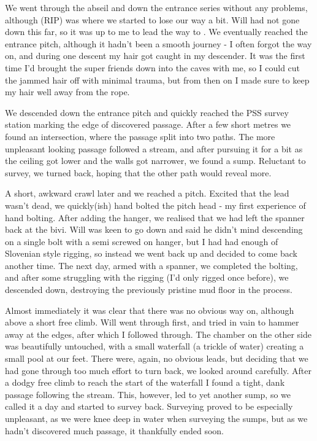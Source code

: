 We went through the abseil and down the entrance series without any problems, although  (RIP) was where we started to lose our way a bit. Will had not gone down this far, so it was up to me to lead the way to . We eventually reached the  entrance pitch, although it hadn't been a smooth journey - I often forgot the way on, and during one descent my hair got caught in my descender. It was the first time I'd brought the super friends down into the caves with me, so I could cut the jammed hair off with minimal trauma, but from then on I made sure to keep my hair well away from the rope.

We descended down the  entrance pitch and quickly reached the PSS survey station marking the edge of discovered passage. After a few short metres we found an intersection, where the passage split into two paths. The more unpleasant looking passage followed a stream, and after pursuing it for a bit as the ceiling got lower and the walls got narrower, we found a sump. Reluctant to survey, we turned back, hoping that the other path would reveal more. 

A short, awkward crawl later and we reached a pitch. Excited that the lead wasn't dead, we quickly(ish) hand bolted the pitch head - my first experience of hand bolting. After adding the hanger, we realised that we had left the spanner back at the bivi. Will was keen to go down and said he didn't mind descending on a single bolt with a semi screwed on hanger, but I had had enough of Slovenian style rigging, so instead we went back up and decided to come back another time.
The next day, armed with a spanner, we completed the bolting, and after some struggling with the rigging (I'd only rigged once before), we descended down, destroying the previously pristine mud floor in the process. 

Almost immediately it was clear that there was no obvious way on, although  above a short free climb. Will went through first, and tried in vain to hammer away at the edges, after which I followed through. The chamber on the other side was beautifully untouched, with a small waterfall (a trickle of water) creating a small pool at our feet. There were, again, no obvious leads, but deciding that we had gone through too much effort to turn back, we looked around carefully. After a dodgy free climb to reach the start of the waterfall I found a tight, dank passage following the stream. This, however, led to yet another sump, so we called it a day and started to survey back. 
Surveying proved to be especially unpleasant, as we were knee deep in water when surveying the sumps, but as we hadn't discovered much passage, it thankfully ended soon.
